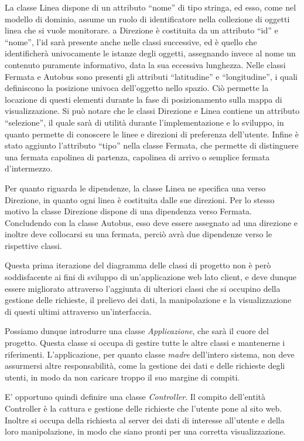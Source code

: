 La classe Linea dispone di un attributo ``nome'' di tipo stringa, ed esso, come nel modello di dominio, assume un ruolo di identificatore nella collezione di oggetti linea che si vuole monitorare.
a Direzione è costituita da un attributo ``id'' e ``nome'', l'id sarà presente anche nelle classi successive, ed è quello che identificherà univocamente le istanze degli oggetti, assegnando invece al nome un contenuto puramente informativo, data la sua eccessiva lunghezza.
Nelle classi Fermata e Autobus sono presenti gli attributi ``latitudine'' e ``longitudine'', i quali definiscono la posizione univoca dell'oggetto nello spazio. Ciò permette la locazione di questi elementi durante la fase di posizionamento sulla mappa di visualizzazione.
Si può notare che le classi Direzione e Linea contiene un attributo ``selezione'', il quale sarà di utilità durante l'implementazione e lo sviluppo, in quanto permette di conoscere le linee e direzioni di preferenza dell'utente.
Infine è stato aggiunto l'attributo ``tipo'' nella classe Fermata, che permette di distinguere una fermata capolinea di partenza, capolinea di arrivo o semplice fermata d'intermezzo.

Per quanto riguarda le dipendenze, la classe Linea ne specifica una verso Direzione, in quanto ogni linea è costituita dalle sue direzioni. Per lo stesso motivo la classe Direzione dispone di una dipendenza verso Fermata. Concludendo con la classe Autobus, esso deve essere assegnato ad una direzione e inoltre deve collocarsi su una fermata, perciò avrà due dipendenze verso le rispettive classi.

Questa prima iterazione del diagramma delle classi di progetto non è però soddisfacente ai fini di sviluppo di un'applicazione web lato client, e deve dunque essere migliorato attraverso l'aggiunta di ulteriori classi che si occupino della gestione delle richieste, il prelievo dei dati, la manipolazione e la visualizzazione di questi ultimi attraverso un'interfaccia.

Possiamo dunque introdurre una classe {\itshape Applicazione}, che sarà il cuore del progetto. Questa classe si occupa di gestire tutte le altre classi e mantenerne i riferimenti.
L'applicazione, per quanto classe {\itshape madre} dell'intero sistema, non deve assurmersi altre responsabilità, come la gestione dei dati e delle richieste degli utenti, in modo da non caricare troppo il suo margine di compiti.

E' opportuno quindi definire una classe {\itshape Controller}. Il compito dell'entità Controller è la cattura e gestione delle richieste che l'utente pone al sito web. Inoltre si occupa della richiesta al server dei dati di interesse all'utente e della loro manipolazione, in modo che siano pronti per una corretta visualizzazione.

